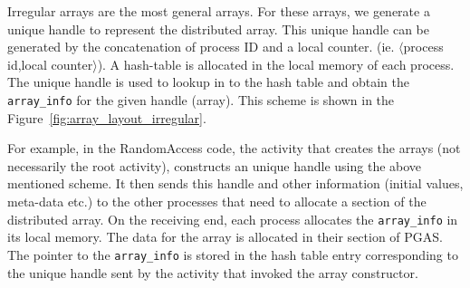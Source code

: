 Irregular arrays are the most general arrays. For these arrays, we generate
a unique handle to represent the distributed array. This unique handle
can be generated by the concatenation of process ID and a local counter.
(ie. $\langle$process id,local counter$\rangle$). A hash-table is allocated
in the local memory of each process. The unique handle is used to lookup in to
the hash table and obtain the {\tt array\_info} for the given handle (array). 
This scheme is shown in the Figure~\ref{fig:array_layout_irregular}.

For example, in the RandomAccess code, the activity that creates the 
arrays (not necessarily the root activity), constructs an unique handle
using the above mentioned scheme. It then sends this handle and other
information (initial values, meta-data etc.) to the other processes
that need to allocate a section of the distributed array. On the receiving 
end, each process allocates the {\tt array\_info} in its local memory.
The data for the array is allocated in their section of PGAS. The pointer
to the {\tt array\_info} is stored in the hash table entry corresponding
to the unique handle sent by the activity that invoked the array constructor. 




